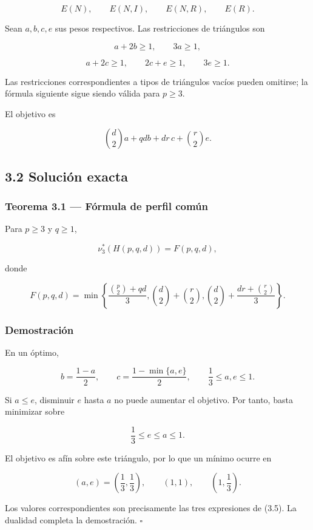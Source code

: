 \documentclass[
  11pt,
]{article}
\begin{document}
\[
E(N),
\qquad E(N,I),
\qquad E(N,R),
\qquad E(R).
\]

Sean \(a,b,c,e\) sus pesos respectivos. Las restricciones de triángulos
son

\[
a+2b\ge1,
\qquad
3a\ge1,
\tag{3.1}
\]

\[
a+2c\ge1,
\qquad
2c+e\ge1,
\qquad
3e\ge1.
\tag{3.2}
\]

Las restricciones correspondientes a tipos de triángulos vacíos pueden
omitirse; la fórmula siguiente sigue siendo válida para \(p\ge3\).

El objetivo es

\[
\binom d2a+qdb+dr\,c+\binom r2e.
\tag{3.3}
\]

\subsection{3.2 Solución exacta}\label{soluciuxf3n-exacta}

\subsubsection{Teorema 3.1 --- Fórmula de perfil
común}\label{teorema-3.1-fuxf3rmula-de-perfil-comuxfan}

Para \(p\ge3\) y \(q\ge1\),

\[
\boxed{
\nu_3^*(H(p,q,d))
=
F(p,q,d),
}
\tag{3.4}
\]

donde

\[
\boxed{
F(p,q,d)
=
\min\left\{
\frac{\binom p2+qd}{3},
\binom d2+\binom r2,
\binom d2+\frac{dr+\binom r2}{3}
\right\}.
}
\tag{3.5}
\]

\subsubsection{Demostración}\label{demostraciuxf3n}

En un óptimo,

\[
b=\frac{1-a}{2},
\qquad
c=\frac{1-\min\{a,e\}}2,
\qquad
\frac13\le a,e\le1.
\]

Si \(a\le e\), disminuir \(e\) hasta \(a\) no puede aumentar el
objetivo. Por tanto, basta minimizar sobre

\[
\frac13\le e\le a\le1.
\]

El objetivo es afín sobre este triángulo, por lo que un mínimo ocurre en

\[
(a,e)=\left(\frac13,\frac13\right),
\qquad
(1,1),
\qquad
\left(1,\frac13\right).
\]

Los valores correspondientes son precisamente las tres expresiones de
(3.5). La dualidad completa la demostración. \(\square\)
\end{document}

